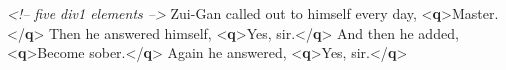 \begin{shaded}
\textit{<!-- five div1 elements -->}\mbox{}\newline 
\hspace*{1em}\mbox{}\newline 
\hspace*{1em}\hspace*{1em}Zui-Gan called out to himself every day, {<\textbf{q}>}Master.{</\textbf{q}>}\mbox{}\newline 
\hspace*{1em}\hspace*{1em}\mbox{}\newline 
\hspace*{1em}\hspace*{1em}Then he answered himself, {<\textbf{q}>}Yes, sir.{</\textbf{q}>}\mbox{}\newline 
\hspace*{1em}\hspace*{1em}\mbox{}\newline 
\hspace*{1em}\hspace*{1em}And then he added, {<\textbf{q}>}Become sober.{</\textbf{q}>}\mbox{}\newline 
\hspace*{1em}\hspace*{1em}\mbox{}\newline 
\hspace*{1em}\hspace*{1em}Again he answered, {<\textbf{q}>}Yes, sir.{</\textbf{q}>}\mbox{}\newline 
\hspace*{1em}\hspace*{1em}\mbox{}\newline 
\hspace*{1em}\hspace*{1em}\mbox{}\newline 

\end{shaded}
